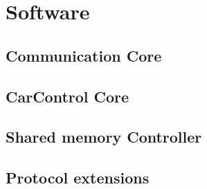 \chapter{Software}

\section{Communication Core}

\section{CarControl Core}

\section{Shared memory Controller}

\section{Protocol extensions}